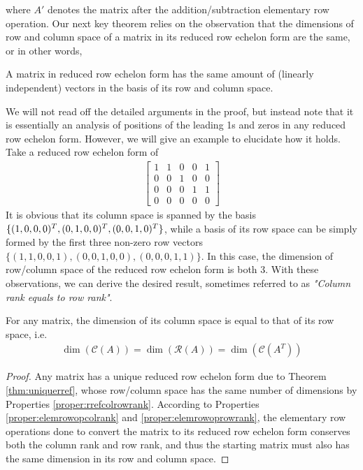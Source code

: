 where $A'$ denotes the matrix after the addition/subtraction elementary row operation. Our next key theorem relies on the observation that the dimensions of row and column space of a matrix in its reduced row echelon form are the same, or in other words,
\begin{proper}
\label{proper:rrefcolrowrank}
A matrix in reduced row echelon form has the same amount of (linearly independent) vectors in the basis of its row and column space.
\end{proper}
We will not read off the detailed arguments in the proof, but instead note that it is essentially an analysis of positions of the leading 1s and zeros in any reduced row echelon form. However, we will give an example to elucidate how it holds. Take a reduced row echelon form of
\begin{align*}
\begin{bmatrix}
1 & 1 & 0 & 0 & 1 \\
0 & 0 & 1 & 0 & 0 \\
0 & 0 & 0 & 1 & 1 \\
0 & 0 & 0 & 0 & 0 
\end{bmatrix}
\end{align*}
It is obvious that its column space is spanned by the basis $\{(1,0,0,0)^T, (0,1,0,0)^T, \\ (0,0,1,0)^T\}$, while a basis of its row space can be simply formed by the first three non-zero row vectors $\{(1,1,0,0,1), (0,0,1,0,0), (0,0,0,1,1)\}$. In this case, the dimension of row/column space of the reduced row echelon form is both $3$. With these observations, we can derive the desired result, sometimes referred to as \textit{"Column rank equals to row rank"}.
\begin{proper}
\label{proper:samecolrowrank}
For any matrix, the dimension of its column space is equal to that of its row space, i.e.
\begin{align*}
\dim(\mathcal{C}(A)) = \dim(\mathcal{R}(A)) = \dim(\mathcal{C}(A^T))
\end{align*}
\end{proper}
\begin{proof}
Any matrix has a unique reduced row echelon form due to Theorem \ref{thm:uniquerref}, whose  row/column space has the same number of dimensions by Properties \ref{proper:rrefcolrowrank}. According to Properties \ref{proper:elemrowopcolrank} and \ref{proper:elemrowoprowrank}, the elementary row operations done to convert the matrix to its reduced row echelon form conserves both the column rank and row rank, and thus the starting matrix must also has the same dimension in its row and column space.
\end{proof}
